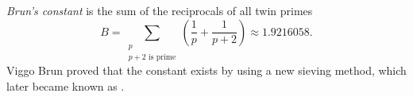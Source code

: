 \documentclass[12pt]{article}
\begin{document}
\emph{Brun's constant} is the sum of the reciprocals of all twin primes
\begin{equation*}
B=\sum_{\substack{p\\p+2 \text{ is prime}}} \left(\frac{1}{p}+\frac{1}{p+2}\right)\approx 1.9216058.
\end{equation*}
Viggo Brun proved that the constant exists by using a new sieving method, which later became known as .
\end{document}

